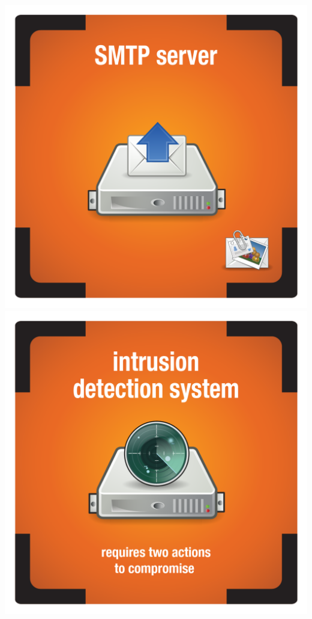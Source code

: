 \documentclass{letter}
\begin{document}
\includegraphics{tiles/node_smtp_server_compromised}
\includegraphics{tiles/node_intrusion_sys_compromised} \\
\end{document}
